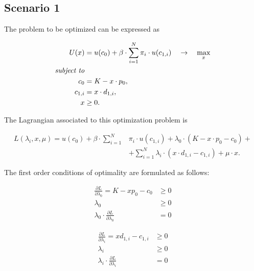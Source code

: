 \subsection{Scenario 1}

\noindent The problem to be optimized can be expressed as

\begin{equation}\label{eq:opt.prob1}
\begin{split}
    U(x) &= u(c_0) + \beta \cdot \sum_{i=1}^{N} \pi_i \cdot u(c_{1,i}) \quad \rightarrow \quad \max_{x}\\
    \text{\textit{subject to}} &\\
    c_0 & = K - x \cdot p_0, \\
    c_{1,i} & = x \cdot d_{1,i}, \\
    x & \geq 0.
\end{split}   
\end{equation}

\bigskip

\noindent The Lagrangian associated to this optimization problem is

\begin{equation}\label{eqn:lagr_risky}
\begin{split}
    L(\lambda_i, x, \mu) = u(c_0) + \beta \cdot \sum_{i=1}^{N} & \pi_i \cdot u(c_{1,i}) + \lambda_0 \cdot (K-x \cdot p_0-c_0) + \\ & + \sum_{i=1}^{N} \lambda_i \cdot (x \cdot d_{1,i} - c_{1,i}) + \mu \cdot x.
\end{split}
\end{equation}

\bigskip

\noindent The first order conditions of optimality are formulated as follows:

\begin{minipage}{0.45\textwidth}
    \begin{subequations}\label{eq:lagr1,lambda_0}
    \begin{align}
        \frac{\partial L}{\partial \lambda_0} = K - xp_0 - c_0 & \geq 0 \\
        \lambda_0 & \geq 0 \\
        \lambda_0 \cdot \frac{\partial L}{\partial \lambda_0} & = 0
    \end{align}
    \end{subequations}
\end{minipage}\hfill
\begin{minipage}{0.45\textwidth}
    \begin{subequations}\label{eq:lagr1,lambda_i}
    \begin{align}
        \frac{\partial L}{\partial \lambda_i} = x d_{1,i} - c_{1,i} & \geq 0\\
        \lambda_i & \geq 0\\
        \lambda_i \cdot \frac{\partial L}{\partial \lambda_i} & = 0
    \end{align}
    \end{subequations}    
\end{minipage}\hfill

